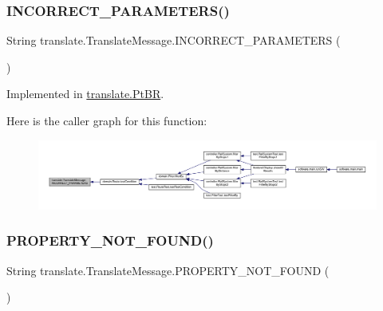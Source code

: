 \subsubsection{\texorpdfstring{I\+N\+C\+O\+R\+R\+E\+C\+T\+\_\+\+P\+A\+R\+A\+M\+E\+T\+E\+R\+S()}{INCORRECT\_PARAMETERS()}}
{\footnotesize\ttfamily String translate.\+Translate\+Message.\+I\+N\+C\+O\+R\+R\+E\+C\+T\+\_\+\+P\+A\+R\+A\+M\+E\+T\+E\+RS (\begin{DoxyParamCaption}{ }\end{DoxyParamCaption})}



Implemented in \hyperlink{classtranslate_1_1_pt_b_r_adaf7225439d23bc30ffd45644c9142b8}{translate.\+Pt\+BR}.

Here is the caller graph for this function\+:\nopagebreak
\begin{figure}[H]
\begin{center}
\leavevmode
\includegraphics[width=350pt]{interfacetranslate_1_1_translate_message_ac31959ba666c507f8a95e889e8270461_icgraph}
\end{center}
\end{figure}
\mbox{\label{interfacetranslate_1_1_translate_message_a08a2eabc6729bdd4a63f98aa1cc418e3}} 
\subsubsection{\texorpdfstring{P\+R\+O\+P\+E\+R\+T\+Y\+\_\+\+N\+O\+T\+\_\+\+F\+O\+U\+N\+D()}{PROPERTY\_NOT\_FOUND()}}
{\footnotesize\ttfamily String translate.\+Translate\+Message.\+P\+R\+O\+P\+E\+R\+T\+Y\+\_\+\+N\+O\+T\+\_\+\+F\+O\+U\+ND (\begin{DoxyParamCaption}{ }\end{DoxyParamCaption})}



